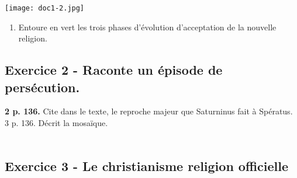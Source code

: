 \documentclass{beamer}
\begin{document}
     \begin{frame}
          \texttt{[image: doc1-2.jpg]}
               \begin{enumerate}
               \item Entoure en vert les trois phases d'évolution d'acceptation de la nouvelle religion.
               \end{enumerate}
          \end{frame}
     
    \subsection{ Exercice 2 - Raconte un épisode de persécution.}
 
 \begin{frame}
 \textbf{2 p. 136.} Cite dans le texte, le reproche majeur que Saturninus fait à Spératus. \textcolor{black!70!green}{}\\
      
      3 p. 136. Décrit la mosaïque. \\
      \textcolor{black!70!green}{}\\
 \end{frame}    
         
    \subsection{ Exercice 3 - Le christianisme religion officielle}
     
\end{document}
